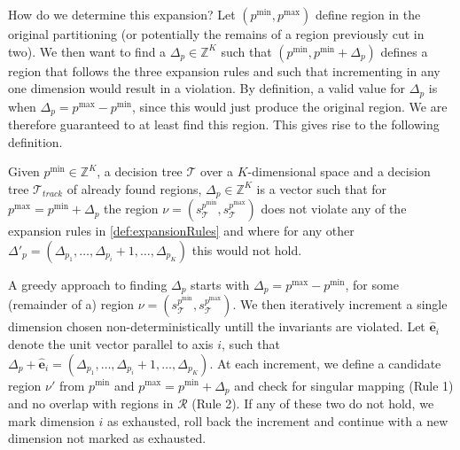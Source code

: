 How do we determine this expansion? Let $(p^{\min}, p^{\max})$ define region in
the original partitioning (or potentially the remains of a region previously cut
in two). We then want to find a $\Delta_p \in \mathbb{Z}^K$ such that
$(p^{\min}, p^{\min} + \Delta_p)$ defines a region that follows the three
expansion rules and such that incrementing in any one dimension would result in
a violation. By definition, a valid value for $\Delta_p$ is when $\Delta_p =
p^{\max} - p^{\min}$, since this would just produce the original region. We are
therefore guaranteed to at least find this region. This gives rise to the
following definition.



\begin{definition}\label{def:deltaP}
    Given $p^{\min} \in \mathbb{Z}^{K}$, a decision tree $\mathcal{T}$ over a
    $K$-dimensional space and a decision tree $\mathcal{T}_{track}$ of already
    found regions, $\Delta_{p} \in \mathbb{Z}^{K}$ is a vector such that for
    $p^{\max} = p^{\min} + \Delta_{p}$ the region $\nu =
    (s^{p^{\min}}_{\mathcal{T}}, s^{p^{\max}}_{\mathcal{T}})$ does not violate
    any of the expansion rules in \cref{def:expansionRules} and where
    for any other $\Delta'_p = (\Delta_{p_{1}}, \ldots, \Delta_{p_{i}} + 1,
    \ldots, \Delta_{p_{K}})$ this would not hold.
\end{definition}

\noindent A greedy approach to finding $\Delta_{p}$ starts with $\Delta_{p} =
p^{\max} - p^{\min}$, for some (remainder of a) region $\nu =
(s^{p^{\min}}_{\mathcal{T}}, s^{p^{\max}}_{\mathcal{T}})$. We then iteratively
increment a single dimension chosen non-deterministically untill the invariants
are violated.  Let $\mathbf{\hat{e}}_i$ denote the unit vector parallel to axis
$i$, such that $\Delta_{p} + \mathbf{\hat{e}}_i =
(\Delta_{p_1},\ldots,\Delta_{p_i} + 1,\ldots,\Delta_{p_K})$. At each increment,
we define a candidate region $\nu'$ from $p^{\min}$ and $p^{\max} = p^{\min} +
\Delta_{p}$ and check for singular mapping (Rule 1) and no overlap with regions
in $\mathcal{R}$ (Rule 2). If any of these two do not hold, we mark dimension
$i$ as exhausted, roll back the increment and continue with a new dimension not
marked as exhausted.

